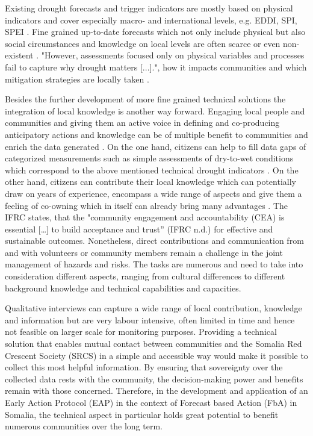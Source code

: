Existing drought forecasts and trigger indicators are mostly based on physical indicators and cover especially macro- and international levels, e.g. EDDI, SPI, SPEI . Fine grained up-to-date forecasts which not only include physical but also social circumstances and knowledge on local levels are often scarce or even non-existent . "However, assessments focused only on physical variables and processes fail to capture why drought matters [...]."\autocite[3]{lackstromBackyardHydroclimatologyCitizen2022}, how it impacts communities and which mitigation strategies are locally taken .\newline

Besides the further development of more fine grained technical solutions the integration of local knowledge is another way forward. Engaging local people and communities and giving them an active voice in defining and co-producing anticipatory actions and knowledge can be of multiple benefit to communities and enrich the data generated \autocite{somaliredcrescentsocietyFeasibilityStudyPotential2022, njambi-szlapkaIntegratingCommunityVoices}. On the one hand, citizens can help to fill data gaps of categorized measurements such as simple assessments of dry-to-wet conditions which correspond to the above mentioned technical drought indicators \autocite{lackstromBackyardHydroclimatologyCitizen2022}. On the other hand, citizens can contribute their local knowledge which can potentially draw on years of experience, encompass a wide range of aspects and give them a feeling of co-owning which in itself can already bring many advantages \autocite{njambi-szlapkaIntegratingCommunityVoices}. The IFRC states, that the "community engagement and accountability (CEA) is essential […] to build acceptance and trust” \autocite{ifrcCommunityEngagementAccountability}(IFRC n.d.) for effective and sustainable outcomes. 
Nonetheless, direct contributions and communication from and with volunteers or community members remain a challenge in the joint management of hazards and risks. The tasks are numerous and need to take into consideration different aspects, ranging from cultural differences to different background knowledge and technical capabilities and capacities.

Qualitative interviews can capture a wide range of local contribution, knowledge and information but are very labour intensive, often limited in time and hence not feasible on larger scale for monitoring purposes. Providing a technical solution that enables mutual contact between communities and the Somalia Red Crescent Society (SRCS) in a simple and accessible way would make it possible to collect this most helpful information. By ensuring that sovereignty over the collected data rests with the community, the decision-making power and benefits remain with those concerned. Therefore, in the development and application of an Early Action Protocol (EAP) in the context of Forecast based Action (FbA) in Somalia, the technical aspect in particular holds great potential to benefit numerous communities over the long term.

